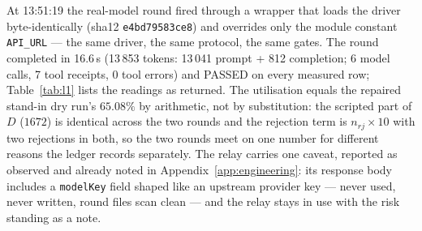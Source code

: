 \documentclass[11pt,a4paper]{article}
\begin{document}
At 13:51:19 the real-model round fired through a wrapper that loads the driver byte-identically (sha12 \texttt{e4bd79583ce8}) and overrides only the module constant \texttt{API\_URL} --- the same driver, the same protocol, the same gates. The round completed in 16.6\,s (13\,853 tokens: 13\,041 prompt + 812 completion; 6 model calls, 7 tool receipts, 0 tool errors) and PASSED on every measured row; Table~\ref{tab:l1} lists the readings as returned. The utilisation equals the repaired stand-in dry run's $65.08\%$ by arithmetic, not by substitution: the scripted part of $D$ ($1672$) is identical across the two rounds and the rejection term is $n_{rj} \times 10$ with two rejections in both, so the two rounds meet on one number for different reasons the ledger records separately. The relay carries one caveat, reported as observed and already noted in Appendix~\ref{app:engineering}: its response body includes a \texttt{modelKey} field shaped like an upstream provider key --- never used, never written, round files scan clean --- and the relay stays in use with the risk standing as a note.
\end{document}
